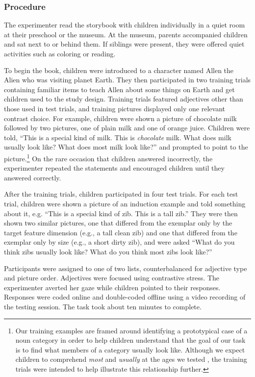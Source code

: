 \documentclass[man]{apa2}
\begin{document}
\subsubsection{Procedure}

The experimenter read the storybook with children individually in a quiet room at their preschool or the museum.  At the museum, parents accompanied children and sat next to or behind them.  If siblings were present, they were offered quiet activities such as coloring or reading.

To begin the book, children were introduced to a character named Allen the Alien who was visiting planet Earth.  They then participated in two training trials containing familiar items to teach Allen about some things on Earth and get children used to the study design.  Training trials featured adjectives other than those used in test trials, and training pictures displayed only one relevant contrast choice.  For example, children were shown a picture of chocolate milk followed by two pictures, one of plain milk and one of orange juice. Children were told, ``This is a special kind of milk. This is \emph{chocolate} milk.  What does milk usually look like?  What does most milk look like?'' and prompted to point to the picture.\footnote{Our training examples are framed around identifying a prototypical case of a noun category in order to help children understand that the goal of our task is to find what members of a category usually look like. Although we expect children to comprehend \emph{most} and \emph{usually} at the ages we tested \cite{halberda2008}, the training trials were intended to  help illustrate this relationship further.}
On the rare occasion that children answered incorrectly, the experimenter repeated the statements and encouraged children until they answered correctly.  

After the training trials, children participated in four test trials.  For each test trial, children were shown a picture of an induction example and told something about it, e.g. ``This is a special kind of zib.  This is a tall zib.''  They were then shown two similar pictures, one that differed from the exemplar only by the target feature dimension (e.g., a tall clean zib) and one that differed from the exemplar only by size (e.g., a short dirty zib), and were asked ``What do you think zibs usually look like?  What do you think most zibs look like?'' 

Participants were assigned to one of two lists, counterbalanced for adjective type and picture order.  Adjectives were focused using contrastive stress. The experimenter averted her gaze while children pointed to their responses.  Responses were coded online and double-coded offline using a video recording of the testing session.  The task took about ten minutes to complete. 
\end{document}

